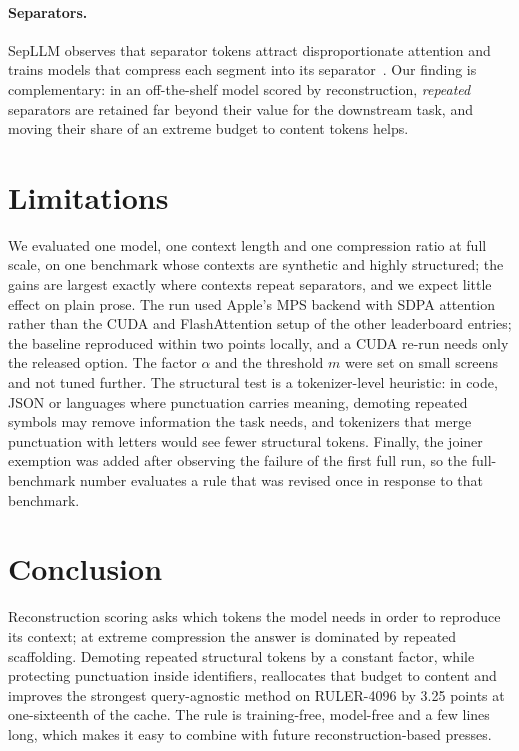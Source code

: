 \documentclass[11pt]{article}
\begin{document}
\paragraph{Separators.} SepLLM observes that separator tokens attract disproportionate attention and trains models that compress
each segment into its separator~\cite{chen2024sepllm}. Our finding is complementary: in an off-the-shelf model scored by
reconstruction, \emph{repeated} separators are retained far beyond their value for the downstream task, and moving their share of
an extreme budget to content tokens helps.

\section{Limitations}
We evaluated one model, one context length and one compression ratio at full scale, on one benchmark whose contexts are synthetic
and highly structured; the gains are largest exactly where contexts repeat separators, and we expect little effect on plain prose.
The run used Apple's MPS backend with SDPA attention rather than the CUDA and FlashAttention setup of the other leaderboard entries;
the baseline reproduced within two points locally, and a CUDA re-run needs only the released option. The factor $\alpha$ and the
threshold $m$ were set on small screens and not tuned further. The structural test is a tokenizer-level heuristic: in code, JSON or
languages where punctuation carries meaning, demoting repeated symbols may remove information the task needs, and tokenizers that
merge punctuation with letters would see fewer structural tokens. Finally, the joiner exemption was added after observing the
failure of the first full run, so the full-benchmark number evaluates a rule that was revised once in response to that benchmark.

\section{Conclusion}
Reconstruction scoring asks which tokens the model needs in order to reproduce its context; at extreme compression the answer is
dominated by repeated scaffolding. Demoting repeated structural tokens by a constant factor, while protecting punctuation inside
identifiers, reallocates that budget to content and improves the strongest query-agnostic method on RULER-4096 by 3.25 points at
one-sixteenth of the cache. The rule is training-free, model-free and a few lines long, which makes it easy to combine with future
reconstruction-based presses.
\end{document}
